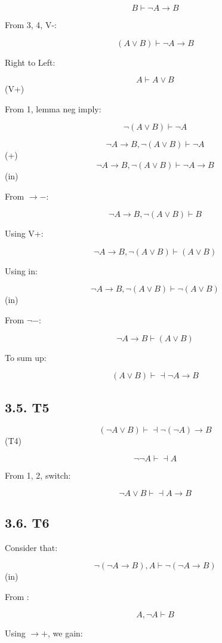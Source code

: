 \documentclass{article} %
\begin{document}
\[B \vdash \neg A \rightarrow B\]

From 3, 4, V-:

\[(A \vee B) \vdash \neg A \rightarrow B\]

Right to Left:

\[A\vdash A \vee B\] (V+)

From 1, lemma neg imply:

\[\neg (A \vee B) \vdash \neg A\]

\[\neg A \rightarrow B , \neg (A \vee B)\vdash \neg A \] (+)
\[\neg A \rightarrow B , \neg (A \vee B)\vdash \neg A \rightarrow B \]
(in)

From \(\rightarrow-\):

\[\neg A \rightarrow B , \neg (A \vee B)\vdash B \]

Using V+:

\[\neg A \rightarrow B , \neg (A \vee B)\vdash (A \vee B) \]

Using in:

\[\neg A \rightarrow B , \neg (A \vee B)\vdash \neg (A \vee B) \] (in)

From \(\neg-\):

\[\neg A \rightarrow B \vdash (A \vee B) \]

To sum up:

\[(A \vee B) \vdash \dashv \neg A \rightarrow B\]

\hypertarget{t5}{%
\subsection{3.5. T5}\label{t5}}

\[(\neg A \vee B) \vdash \dashv \neg(\neg A) \rightarrow B\] (T4)

\[\neg \neg A \vdash \dashv A\]

From 1, 2, switch:

\[ \neg A \vee B \vdash \dashv A \rightarrow B \]

\hypertarget{t6}{%
\subsection{3.6. T6}\label{t6}}

Consider that:

\[\neg(\neg A \rightarrow B) , A\vdash \neg(\neg A \rightarrow B)\] (in)

From :

\[A, \neg A \vdash B\]

Using \(\rightarrow+\), we gain:
\end{document}
